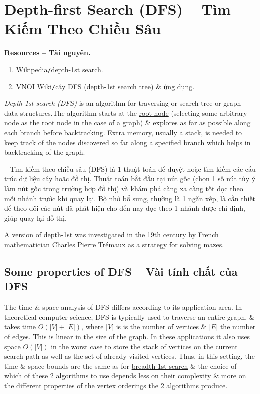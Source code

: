 \documentclass[oneside]{book}
\begin{document}
\section{Depth-first Search (DFS) -- Tìm Kiếm Theo Chiều Sâu}
\textbf{\textsf{Resources -- Tài nguyên.}}
\begin{enumerate}
	\item \href{https://en.wikipedia.org/wiki/Depth-first_search}{Wikipedia{\tt/}depth-1st search}.
	\item \href{https://wiki.vnoi.info/algo/graph-theory/Depth-First-Search-Tree.md}{VNOI Wiki{\tt/}cây DFS (depth-1st search tree) \& ứng dụng}.
\end{enumerate}
{\it Depth-1st search (DFS)} is an algorithm for traversing or search tree or graph data structures.The algorithm starts at the \href{https://en.wikipedia.org/wiki/Tree_(data_structure)#Terminology}{root node} (selecting some arbitrary node as the root node in the case of a graph) \& explores as far as possible along each branch before backtracking. Extra memory, usually a \href{https://en.wikipedia.org/wiki/Stack_(abstract_data_type)}{stack}, is needed to keep track of the nodes discovered so far along a specified branch which helps in backtracking of the graph.

-- Tìm kiếm theo chiều sâu (DFS) là 1 thuật toán để duyệt hoặc tìm kiếm các cấu trúc dữ liệu cây hoặc đồ thị. Thuật toán bắt đầu tại nút gốc (chọn 1 số nút tùy ý làm nút gốc trong trường hợp đồ thị) và khám phá càng xa càng tốt dọc theo mỗi nhánh trước khi quay lại. Bộ nhớ bổ sung, thường là 1 ngăn xếp, là cần thiết để theo dõi các nút đã phát hiện cho đến nay dọc theo 1 nhánh được chỉ định, giúp quay lại đồ thị.

A version of depth-1st was investigated in the 19th century by French mathematician \href{https://en.wikipedia.org/wiki/Charles_Pierre_Tr%C3%A9maux}{\sc Charles Pierre Tr\'emaux} as a strategy for \href{https://en.wikipedia.org/wiki/Maze_solving_algorithm}{solving mazes}.


\subsection{Some properties of DFS -- Vài tính chất của DFS}
The time \& space analysis of DFS differs according to its application area. In theoretical computer science, DFS is typically used to traverse an entire graph, \& takes time $O(|V| + |E|)$, where $|V|$ is is the number of vertices \& $|E|$ the number of edges. This is linear in the size of the graph. In these applications it also uses space $O(|V|)$ in the worst case to store the stack of vertices on the current search path as well as the set of already-visited vertices. Thus, in this setting, the time \& space bounds are the same as for \href{https://en.wikipedia.org/wiki/Breadth-first_search}{breadth-1st search} \& the choice of which of these 2 algorithms to use depends less on their complexity \& more on the different properties of the vertex orderings the 2 algorithms produce.
\end{document}
